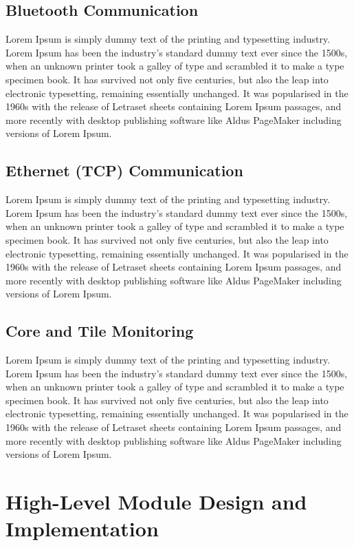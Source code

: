 \subsection{Bluetooth Communication}
Lorem Ipsum is simply dummy text of the printing and typesetting industry. Lorem Ipsum has been the industry's standard dummy text ever since the 1500s, when an unknown printer took a galley of type and scrambled it to make a type specimen book. It has survived not only five centuries, but also the leap into electronic typesetting, remaining essentially unchanged. It was popularised in the 1960s with the release of Letraset sheets containing Lorem Ipsum passages, and more recently with desktop publishing software like Aldus PageMaker including versions of Lorem Ipsum.

\subsection{Ethernet (TCP) Communication}
Lorem Ipsum is simply dummy text of the printing and typesetting industry. Lorem Ipsum has been the industry's standard dummy text ever since the 1500s, when an unknown printer took a galley of type and scrambled it to make a type specimen book. It has survived not only five centuries, but also the leap into electronic typesetting, remaining essentially unchanged. It was popularised in the 1960s with the release of Letraset sheets containing Lorem Ipsum passages, and more recently with desktop publishing software like Aldus PageMaker including versions of Lorem Ipsum.

\subsection{Core and Tile Monitoring}
Lorem Ipsum is simply dummy text of the printing and typesetting industry. Lorem Ipsum has been the industry's standard dummy text ever since the 1500s, when an unknown printer took a galley of type and scrambled it to make a type specimen book. It has survived not only five centuries, but also the leap into electronic typesetting, remaining essentially unchanged. It was popularised in the 1960s with the release of Letraset sheets containing Lorem Ipsum passages, and more recently with desktop publishing software like Aldus PageMaker including versions of Lorem Ipsum.


\section{High-Level Module Design and Implementation}
